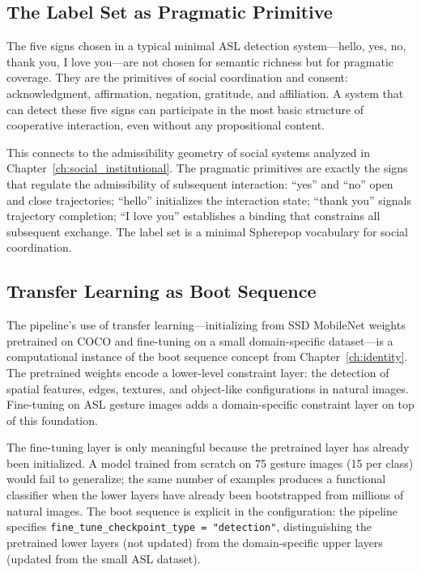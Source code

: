 \subsection{The Label Set as Pragmatic Primitive}

The five signs chosen in a typical minimal ASL detection system---hello, yes, no,
thank you, I love you---are not chosen for semantic richness but for pragmatic
coverage. They are the primitives of social coordination and consent: acknowledgment,
affirmation, negation, gratitude, and affiliation. A system that can detect these
five signs can participate in the most basic structure of cooperative interaction,
even without any propositional content.

\claimP This connects to the admissibility geometry of social systems analyzed in
Chapter~\ref{ch:social_institutional}. The pragmatic primitives are exactly the
signs that regulate the admissibility of subsequent interaction: ``yes'' and ``no''
open and close trajectories; ``hello'' initializes the interaction state; ``thank
you'' signals trajectory completion; ``I love you'' establishes a binding that
constrains all subsequent exchange. The label set is a minimal Spherepop vocabulary
for social coordination.

\subsection{Transfer Learning as Boot Sequence}

The pipeline's use of transfer learning---initializing from SSD MobileNet weights
pretrained on COCO and fine-tuning on a small domain-specific dataset---is a
computational instance of the boot sequence concept from Chapter~\ref{ch:identity}.
The pretrained weights encode a lower-level constraint layer: the detection of
spatial features, edges, textures, and object-like configurations in natural images.
Fine-tuning on ASL gesture images adds a domain-specific constraint layer on top of
this foundation.

The fine-tuning layer is only meaningful because the pretrained layer has already
been initialized. A model trained from scratch on 75 gesture images (15 per class)
would fail to generalize; the same number of examples produces a functional
classifier when the lower layers have already been bootstrapped from millions of
natural images. The boot sequence is explicit in the configuration: the pipeline
specifies \texttt{fine\_tune\_checkpoint\_type = "detection"}, distinguishing the
pretrained lower layers (not updated) from the domain-specific upper layers (updated
from the small ASL dataset).

